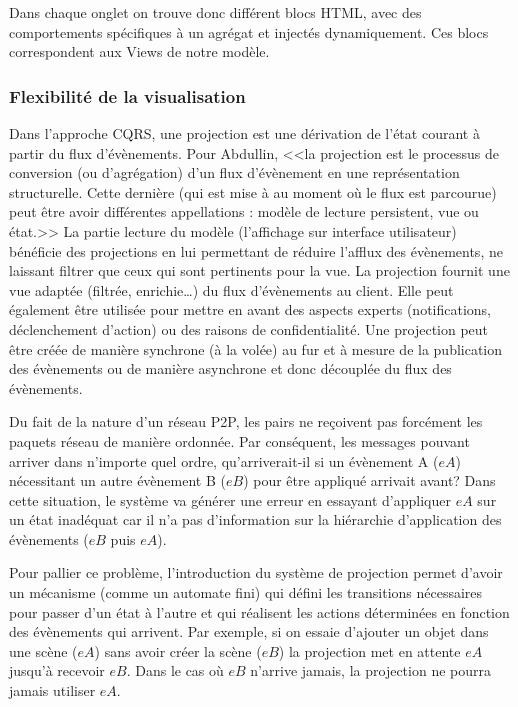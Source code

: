 Dans chaque onglet on trouve donc différent blocs \gls{HTML}, avec des 
comportements spécifiques à un agrégat et injectés dynamiquement. Ces blocs 
correspondent aux Views de notre modèle.

\subsubsection{Flexibilité de la visualisation}
Dans l'approche \gls{CQRS}, une projection est une dérivation de l'état courant à 
partir du flux d'évènements. Pour Abdullin, <<la projection est le processus de 
conversion (ou d'agrégation) d'un flux d'évènement en une représentation 
structurelle. Cette dernière (qui est mise à au moment où le flux est parcourue) 
peut être avoir différentes appellations : modèle de lecture persistent, vue ou 
état.>>
La partie lecture du modèle (l'affichage sur interface utilisateur) bénéficie des 
projections en lui permettant de réduire l'afflux des évènements, ne laissant filtrer 
que ceux qui sont pertinents pour la vue. La projection fournit une vue adaptée 
(filtrée, enrichie\ldots) du flux d'évènements au client. Elle peut également être 
utilisée pour mettre en avant des aspects experts (notifications, déclenchement 
d'action) ou des raisons de confidentialité.
Une projection peut être créée de manière synchrone (à la volée) au fur et à 
mesure de la publication des évènements ou de manière asynchrone et donc 
découplée du flux des évènements. 


Du fait de la nature d'un réseau \gls{P2P}, les pairs ne reçoivent pas forcément les 
paquets réseau de manière ordonnée.
Par conséquent, les messages pouvant arriver dans n'importe quel ordre, 
qu'arriverait-il si un évènement A ($eA$) nécessitant un autre évènement B ($eB$) 
pour être appliqué arrivait avant? Dans cette situation, le système va générer une 
erreur en essayant d'appliquer $eA$ sur un état inadéquat car il n'a pas 
d'information sur la hiérarchie d'application des évènements ($eB$ puis $eA$).

Pour pallier ce problème, l'introduction du système de projection permet d'avoir un 
mécanisme (comme un automate fini) qui défini les transitions nécessaires pour 
passer d'un état à l'autre et qui réalisent les actions déterminées en fonction des 
évènements qui arrivent. Par exemple, si on essaie d'ajouter un objet dans une 
scène  ($eA$) sans avoir créer la scène ($eB$) la projection met en attente $eA$ 
jusqu'à recevoir $eB$. Dans le cas où $eB$ n'arrive jamais, la projection ne pourra 
jamais utiliser $eA$.

